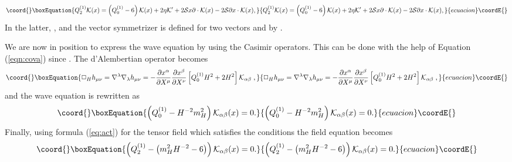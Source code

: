 \documentclass[a4paper,11pt,showpacs,preprintnumbers]{revtex4}
\begin{document}
\begin{equation}\coord{}\boxEquation{\label{eq:act}
Q_2^{(1)}{\cal K}(x)=\left(Q_{0}^{(1)}-6\right){\cal K}(x)+2\eta
{\cal K}'+2{\cal S} x\partial\cdot{\cal K}(x)-2{\cal S}  \partial
x\cdot{\cal K}(x),
}{Q_2^{(1)}{\cal K}(x)=\left(Q_{0}^{(1)}-6\right){\cal K}(x)+2\eta
{\cal K}'+2{\cal S} x\partial\cdot{\cal K}(x)-2{\cal S}  \partial
x\cdot{\cal K}(x),
}{ecuacion}\coordE{}\end{equation}
In the latter,
\coordHE{}, and
the vector symmetrizer \coordHE{} is defined for two vectors
\myHighlight{$\xi_{\alpha}$}\coordHE{} and \myHighlight{$\omega_{\beta}$}\coordHE{} by \coordHE{}.

We are now in position to express the wave equation
\myHighlight{$(\ref{eq:wav})$}\coordHE{} by using the Casimir operators. This can be done
with the help of Equation (\ref{eqn:cova}) since
\coordHE{}. The d'Alembertian operator
becomes
\begin{equation}\coord{}\boxEquation{
\Box_{H}
h_{\mu\nu}=\nabla^{\lambda}\nabla_{\lambda}h_{\mu\nu}=-\frac{\partial
x^\alpha}{\partial X^\mu} \frac{\partial x^\beta}{\partial X^\nu}
\left[Q_{0}^{(1)}H^2+2H^2\right]{\cal K}_{\alpha\beta} \;,
}{
\Box_{H}
h_{\mu\nu}=\nabla^{\lambda}\nabla_{\lambda}h_{\mu\nu}=-\frac{\partial
x^\alpha}{\partial X^\mu} \frac{\partial x^\beta}{\partial X^\nu}
\left[Q_{0}^{(1)}H^2+2H^2\right]{\cal K}_{\alpha\beta} \;,
}{ecuacion}\coordE{}\end{equation}
and the wave equation \myHighlight{$(\ref{eq:wav})$}\coordHE{} is rewritten as
\begin{equation}\coord{}\boxEquation{
\left(Q_{0}^{(1)}-H^{-2}m_H^2\right){\cal K}_{\alpha\beta}(x)=0.
}{
\left(Q_{0}^{(1)}-H^{-2}m_H^2\right){\cal K}_{\alpha\beta}(x)=0.
}{ecuacion}\coordE{}\end{equation}
Finally, using formula (\ref{eq:act}) for the tensor field \coordHE{} which satisfies the conditions
\myHighlight{$(\ref{eq:con2})$}\coordHE{} the field equation becomes
\begin{equation}\coord{}\boxEquation{
\left( Q_{2}^{(1)}-\left( m^{2}_{H}H^{-2}-6\right) \right){\cal
K}_{\alpha\beta}(x)=0. \label{eq:wave}
}{
\left( Q_{2}^{(1)}-\left( m^{2}_{H}H^{-2}-6\right) \right){\cal
K}_{\alpha\beta}(x)=0. }{ecuacion}\coordE{}\end{equation}
\end{document}
